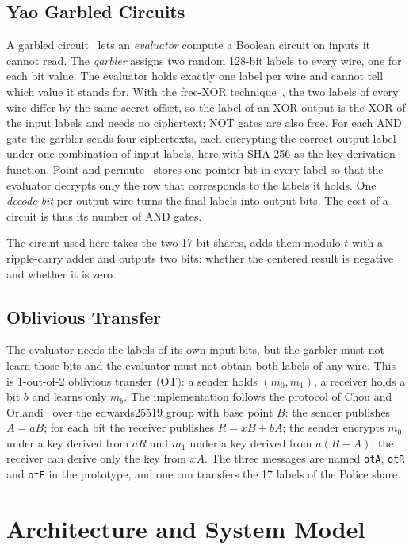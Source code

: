 \documentclass[conference,letterpaper]{IEEEtran}
\begin{document}
\subsection{Yao Garbled Circuits}
A garbled circuit~\cite{yao,bhr} lets an \emph{evaluator} compute a Boolean circuit on inputs it cannot read. The \emph{garbler} assigns two random 128-bit labels to every wire, one for each bit value. The evaluator holds exactly one label per wire and cannot tell which value it stands for. With the free-XOR technique~\cite{freexor}, the two labels of every wire differ by the same secret offset, so the label of an XOR output is the XOR of the input labels and needs no ciphertext; NOT gates are also free. For each AND gate the garbler sends four ciphertexts, each encrypting the correct output label under one combination of input labels, here with SHA-256 as the key-derivation function. Point-and-permute~\cite{bmr} stores one pointer bit in every label so that the evaluator decrypts only the row that corresponds to the labels it holds. One \emph{decode bit} per output wire turns the final labels into output bits. The cost of a circuit is thus its number of AND gates.

The circuit used here takes the two 17-bit shares, adds them modulo $t$ with a ripple-carry adder and outputs two bits: whether the centered result is negative and whether it is zero.

\subsection{Oblivious Transfer}
The evaluator needs the labels of its own input bits, but the garbler must not learn those bits and the evaluator must not obtain both labels of any wire. This is 1-out-of-2 oblivious transfer (OT): a sender holds $(m_0, m_1)$, a receiver holds a bit $b$ and learns only $m_b$. The implementation follows the protocol of Chou and Orlandi~\cite{chou} over the edwards25519 group with base point $B$: the sender publishes $A = aB$; for each bit the receiver publishes $R = xB + bA$; the sender encrypts $m_0$ under a key derived from $aR$ and $m_1$ under a key derived from $a(R - A)$; the receiver can derive only the key from $xA$. The three messages are named \texttt{otA}, \texttt{otR} and \texttt{otE} in the prototype, and one run transfers the 17 labels of the Police share.
\section{Architecture and System Model}
\label{sec:model}
\end{document}
